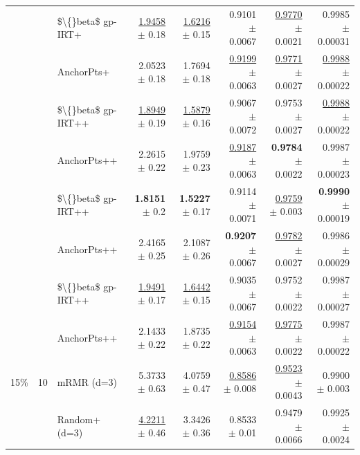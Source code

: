 \begin{longtable}{llp{}rrrrr}
 &  & \$\textbackslash\{\}beta\$ gp-IRT+ & \underline{1.9458} {\scriptsize $\pm$ 0.18} & \underline{1.6216} {\scriptsize $\pm$ 0.15} & 0.9101 {\scriptsize $\pm$ 0.0067} & \underline{0.9770} {\scriptsize $\pm$ 0.0021} & 0.9985 {\scriptsize $\pm$ 0.00031} \\
 &  & AnchorPts+ & 2.0523 {\scriptsize $\pm$ 0.18} & 1.7694 {\scriptsize $\pm$ 0.18} & \underline{0.9199} {\scriptsize $\pm$ 0.0063} & \underline{0.9771} {\scriptsize $\pm$ 0.0027} & \underline{0.9988} {\scriptsize $\pm$ 0.00022} \\
 &  & \$\textbackslash\{\}beta\$ gp-IRT++ & \underline{1.8949} {\scriptsize $\pm$ 0.19} & \underline{1.5879} {\scriptsize $\pm$ 0.16} & 0.9067 {\scriptsize $\pm$ 0.0072} & 0.9753 {\scriptsize $\pm$ 0.0027} & \underline{0.9988} {\scriptsize $\pm$ 0.00022} \\
 &  & AnchorPts++ & 2.2615 {\scriptsize $\pm$ 0.22} & 1.9759 {\scriptsize $\pm$ 0.23} & \underline{0.9187} {\scriptsize $\pm$ 0.0063} & \textbf{0.9784} {\scriptsize $\pm$ 0.0022} & 0.9987 {\scriptsize $\pm$ 0.00023} \\
 &  & \$\textbackslash\{\}beta\$ gp-IRT++ & \textbf{1.8151} {\scriptsize $\pm$ 0.2} & \textbf{1.5227} {\scriptsize $\pm$ 0.17} & 0.9114 {\scriptsize $\pm$ 0.0071} & \underline{0.9759} {\scriptsize $\pm$ 0.003} & \textbf{0.9990} {\scriptsize $\pm$ 0.00019} \\
 &  & AnchorPts++ & 2.4165 {\scriptsize $\pm$ 0.25} & 2.1087 {\scriptsize $\pm$ 0.26} & \textbf{0.9207} {\scriptsize $\pm$ 0.0067} & \underline{0.9782} {\scriptsize $\pm$ 0.0027} & 0.9986 {\scriptsize $\pm$ 0.00029} \\
 &  & \$\textbackslash\{\}beta\$ gp-IRT++ & \underline{1.9491} {\scriptsize $\pm$ 0.17} & \underline{1.6442} {\scriptsize $\pm$ 0.15} & 0.9035 {\scriptsize $\pm$ 0.0067} & 0.9752 {\scriptsize $\pm$ 0.0022} & 0.9987 {\scriptsize $\pm$ 0.00027} \\
 &  & AnchorPts++ & 2.1433 {\scriptsize $\pm$ 0.22} & 1.8735 {\scriptsize $\pm$ 0.22} & \underline{0.9154} {\scriptsize $\pm$ 0.0063} & \underline{0.9775} {\scriptsize $\pm$ 0.0022} & 0.9987 {\scriptsize $\pm$ 0.00022} \\
\midrule
15\% & 10 & mRMR (d=3) & 5.3733 {\scriptsize $\pm$ 0.63} & 4.0759 {\scriptsize $\pm$ 0.47} & \underline{0.8586} {\scriptsize $\pm$ 0.008} & \underline{0.9523} {\scriptsize $\pm$ 0.0043} & 0.9900 {\scriptsize $\pm$ 0.003} \\
 &  & Random+ (d=3) & \underline{4.2211} {\scriptsize $\pm$ 0.46} & 3.3426 {\scriptsize $\pm$ 0.36} & 0.8533 {\scriptsize $\pm$ 0.01} & 0.9479 {\scriptsize $\pm$ 0.0066} & 0.9925 {\scriptsize $\pm$ 0.0024} \\

\end{longtable}
